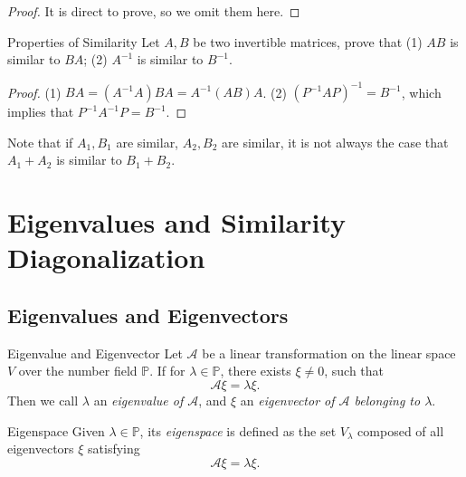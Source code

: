 \begin{proof}
  It is direct to prove, so we omit them here.
\end{proof}

\begin{example}{Properties of Similarity}{}
  Let $A, B$ be two invertible matrices, prove that
  (1) $AB$ is similar to $BA$;
  (2) $A^{-1}$ is similar to $B^{-1}$.
\end{example}

\begin{proof}
  (1) $BA = (A^{-1}A)BA = A^{-1}(AB)A$.
  (2) $(P^{-1}AP)^{-1} = B^{-1}$, which implies that $P^{-1}A^{-1}P = B^{-1}$.
\end{proof}

\begin{note}
  Note that if $A_1, B_1$ are similar, $A_2, B_2$ are similar,
  it is not always the case that $A_1 + A_2$ is similar to $B_1 + B_2$.
\end{note}

\section{Eigenvalues and Similarity Diagonalization}

\subsection{Eigenvalues and Eigenvectors}

\begin{definition}{Eigenvalue and Eigenvector}{}
  Let $\mathcal{A}$ be a linear transformation on the linear space $V$ over the number
  field $\mathbb{P}$.
  If for $\lambda \in \mathbb{P}$, there exists $\xi \neq 0$,
  such that
  \begin{equation}
    \mathcal{A} \xi = \lambda \xi.
  \end{equation}
  Then we call $\lambda$ an \emph{eigenvalue of $\mathcal{A}$},
  and $\xi$ an \emph{eigenvector of $\mathcal{A}$ belonging to $\lambda$}.
\end{definition}

\begin{definition}{Eigenspace}{}
  Given $\lambda \in \mathbb{P}$,
  its \emph{eigenspace} is defined as the set $V_{\lambda}$
  composed of all eigenvectors $\xi$ satisfying
  \begin{equation}
    \mathcal{A} \xi = \lambda \xi.
  \end{equation}
\end{definition}

